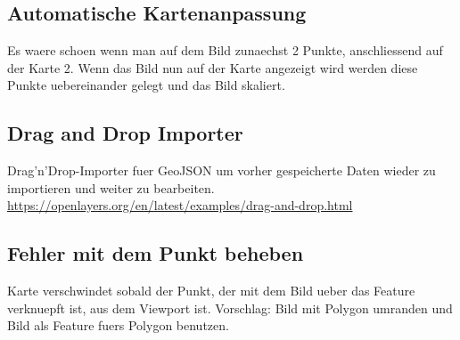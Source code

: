 \documentclass[a4paper, 12.5pt]{scrartcl}
\begin{document}
\subsection{Automatische Kartenanpassung}
Es waere schoen wenn man auf dem Bild zunaechst 2 Punkte, anschliessend auf der Karte 2. Wenn das Bild nun auf der Karte angezeigt wird werden diese Punkte uebereinander gelegt und das Bild skaliert.
\subsection{Drag and Drop Importer}
Drag'n'Drop-Importer fuer GeoJSON um vorher gespeicherte Daten wieder zu importieren und weiter zu bearbeiten. \url{https://openlayers.org/en/latest/examples/drag-and-drop.html}
\subsection{Fehler mit dem Punkt beheben}
Karte verschwindet sobald der Punkt, der mit dem Bild ueber das Feature verknuepft ist, aus dem Viewport ist.
Vorschlag: Bild mit Polygon umranden und Bild als Feature fuers Polygon benutzen.
\end{document}
